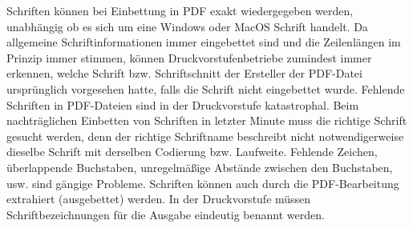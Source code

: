 Schriften können bei Einbettung in PDF exakt wiedergegeben werden, unabhängig ob es sich um eine Windows oder MacOS Schrift handelt. Da allgemeine Schriftinformationen immer eingebettet sind und die Zeilenlängen im Prinzip immer stimmen, können Druckvorstufenbetriebe zumindest immer erkennen, welche Schrift bzw. Schriftschnitt der Ersteller der PDF-Datei ursprünglich vorgesehen hatte, falls die Schrift nicht eingebettet wurde. Fehlende Schriften in PDF-Dateien sind in der Druckvorstufe katastrophal. Beim nachträglichen Einbetten von Schriften in letzter Minute muss die richtige Schrift gesucht werden, denn der richtige Schriftname beschreibt nicht notwendigerweise dieselbe Schrift mit derselben Codierung bzw. Laufweite. Fehlende Zeichen, überlappende Buchstaben, unregelmäßige Abstände zwischen den Buchstaben, usw. sind gängige Probleme. Schriften können auch durch die PDF-Bearbeitung extrahiert (ausgebettet) werden. In der Druckvorstufe müssen Schriftbezeichnungen für die Ausgabe eindeutig benannt werden. \\

